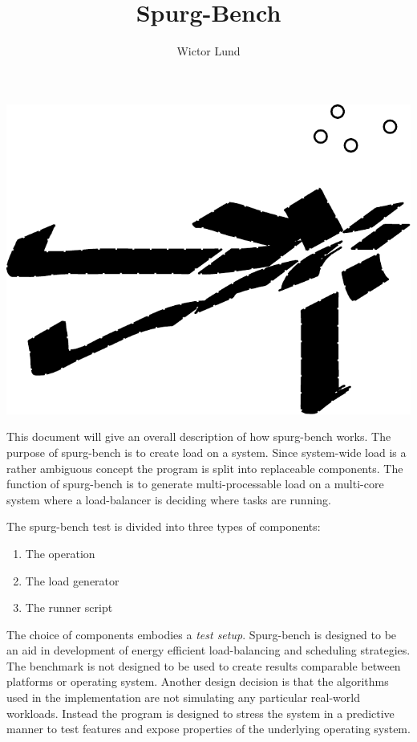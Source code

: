 \documentclass{article}
\title{Spurg-Bench}
\author{Wictor Lund}
\begin{document}
\maketitle

\centerline{\includegraphics[scale=0.4]{sb_logo.pdf}}
\vspace{20mm}

This document will give an overall description of how spurg-bench
works. The purpose of spurg-bench is to create load on a system. Since
system-wide load is a rather ambiguous concept the program is split
into replaceable components. The function of spurg-bench is to
generate multi-processable load on a multi-core system where a
load-balancer is deciding where tasks are running.

The spurg-bench test is divided into three types of components:
\begin{enumerate}
  \item The operation
  \item The load generator
  \item The runner script
\end{enumerate}

The choice of components embodies a \emph{test setup}. Spurg-bench is
designed to be an aid in development of energy efficient
load-balancing and scheduling strategies. The benchmark is not
designed to be used to create results comparable between platforms or
operating system. Another design decision is that the algorithms used
in the implementation are not simulating any particular real-world
workloads. Instead the program is designed to stress the system in a
predictive manner to test features and expose properties of the
underlying operating system.
\end{document}
